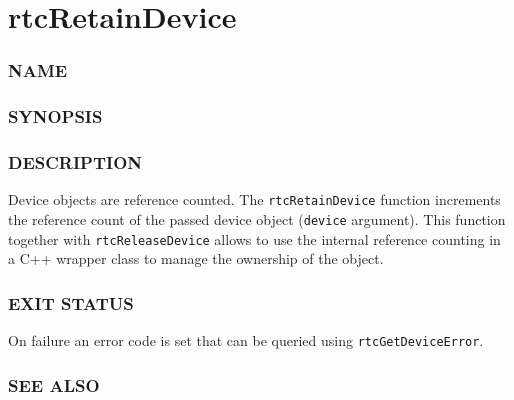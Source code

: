 \section{rtcRetainDevice}\label{rtcretaindevice}

\subsubsection{NAME}\label{name}

\begin{Shaded}
\begin{Highlighting}[]
\OperatorTok{{-}}
\end{Highlighting}
\end{Shaded}

\subsubsection{SYNOPSIS}\label{synopsis}

\begin{Shaded}
\begin{Highlighting}[]

\OperatorTok{(}\OperatorTok{);}
\end{Highlighting}
\end{Shaded}

\subsubsection{DESCRIPTION}\label{description}

Device objects are reference counted. The \texttt{rtcRetainDevice}
function increments the reference count of the passed device object
(\texttt{device} argument). This function together with
\texttt{rtcReleaseDevice} allows to use the internal reference counting
in a C++ wrapper class to manage the ownership of the object.

\subsubsection{EXIT STATUS}\label{exit-status}

On failure an error code is set that can be queried using
\texttt{rtcGetDeviceError}.

\subsubsection{SEE ALSO}\label{see-also}

